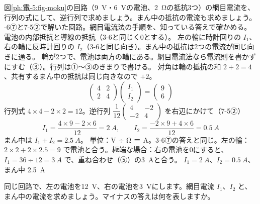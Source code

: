\begin{phreidai}
\label{ph:電-5:ex4}図\ref{ph:電-5:fig-moku}の回路（\qty{9}{V}・\qty{6}{V}の電池、\qty{2}{\ohm}の抵抗3つ）の網目電流を、行列の式にして、逆行列で求めましょう。まん中の抵抗の電流も求めましょう。
-6⑦と7-5②で解いた回路。網目電流法の手順を、知っている答えで確かめる。
\phmushi
電池の内部抵抗と導線の抵抗（3-6と同じく0とする）。
\phzu
左の輪に時計回りの $I_1$、右の輪に反時計回りの $I_2$（3-6と同じ向き）。まん中の抵抗は2つの電流が同じ向きに通る。
\phriyu
輪が2つで、電池は両方の輪にある。網目電流法なら電流則を書かずにすむ（③）。行列は①〜③のきまりで書ける。
\phtateru
対角は輪の抵抗の和 $2+2=4$、共有するまん中の抵抗は同じ向きなので $+2$。
\[ \begin{pmatrix}4&2\\2&4\end{pmatrix}\begin{pmatrix}I_1\\I_2\end{pmatrix}=\begin{pmatrix}9\\6\end{pmatrix} \]
\phtoku
行列式 $4\times4-2\times2=12$。逆行列 $\dfrac{1}{12}\begin{pmatrix}4&-2\\-2&4\end{pmatrix}$ を右辺にかけて（7-5②）
\[ I_1=\frac{4\times9-2\times6}{12}=\qty{2}{A},\qquad I_2=\frac{-2\times9+4\times6}{12}=\qty{0.5}{A} \]
まん中は $I_1+I_2=\qty{2.5}{A}$。
\phtashikame
単位：V ÷ Ω ＝ A。3-6⑦の答えと同じ。左の輪：$2\times2+2\times2.5=9$ で電池と合う。極端な場合：右の電池を0にすると、$I_1=36\div12=\qty{3}{A}$ で、重ね合わせ（⑤）の\qty{3}{A}と合う。
\kotae $I_1=\qty{2}{A}$、$I_2=\qty{0.5}{A}$、まん中 \qty{2.5}{A}
\end{phreidai}
\begin{jibun}
同じ回路で、左の電池を\qty{12}{V}、右の電池を\qty{3}{V}にします。網目電流 $I_1$、$I_2$ と、まん中の電流を求めましょう。マイナスの答えは何を表しますか。
\end{jibun}

